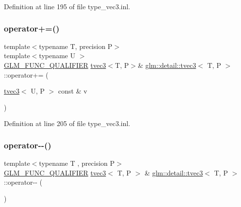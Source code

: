 Definition at line 195 of file type\+\_\+vec3.\+inl.

\mbox{\label{structglm_1_1detail_1_1tvec3_af459080608fac7a3cf88684d44b10fc3}} 
\subsubsection{\texorpdfstring{operator+=()}{operator+=()}\hspace{0.1cm}{\footnotesize\ttfamily [4/4]}}
{\footnotesize\ttfamily template$<$typename T, precision P$>$ \\
template$<$typename U $>$ \\
\hyperlink{setup_8hpp_a33fdea6f91c5f834105f7415e2a64407}{G\+L\+M\+\_\+\+F\+U\+N\+C\+\_\+\+Q\+U\+A\+L\+I\+F\+I\+ER} \hyperlink{structglm_1_1detail_1_1tvec3}{tvec3}$<$T, P$>$\& \hyperlink{structglm_1_1detail_1_1tvec3}{glm\+::detail\+::tvec3}$<$ T, P $>$\+::operator+= (\begin{DoxyParamCaption}\item[{\hyperlink{structglm_1_1detail_1_1tvec3}{tvec3}$<$ U, P $>$ const \&}]{v }\end{DoxyParamCaption})}



Definition at line 205 of file type\+\_\+vec3.\+inl.

\mbox{\label{structglm_1_1detail_1_1tvec3_aaafe373e142ed03ab8e8d550cd660353}} 
\subsubsection{\texorpdfstring{operator-\/-\/()}{operator--()}\hspace{0.1cm}{\footnotesize\ttfamily [1/2]}}
{\footnotesize\ttfamily template$<$typename T , precision P$>$ \\
\hyperlink{setup_8hpp_a33fdea6f91c5f834105f7415e2a64407}{G\+L\+M\+\_\+\+F\+U\+N\+C\+\_\+\+Q\+U\+A\+L\+I\+F\+I\+ER} \hyperlink{structglm_1_1detail_1_1tvec3}{tvec3}$<$ T, P $>$ \& \hyperlink{structglm_1_1detail_1_1tvec3}{glm\+::detail\+::tvec3}$<$ T, P $>$\+::operator-\/-\/ (\begin{DoxyParamCaption}{ }\end{DoxyParamCaption})}




